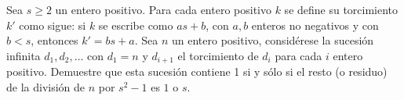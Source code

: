 Sea $s\geq 2$ un entero positivo. Para cada entero positivo $k$ se define su torcimiento $k'$ como sigue: si $k$ se escribe como $as+b$, con $a,b$ enteros no negativos y con $b\lt s$, entonces $k'=bs+a$. Sea $n$ un entero positivo, considérese la sucesión infinita $d_1,d_2,\dots$ con $d_1 = n$ y $d_{i+1}$ el torcimiento de $d_i$ para cada $i$ entero positivo. Demuestre que esta sucesión contiene 1 si y sólo si el resto (o residuo) de la división de $n$ por $s^2-1$ es $1$ o $s$.